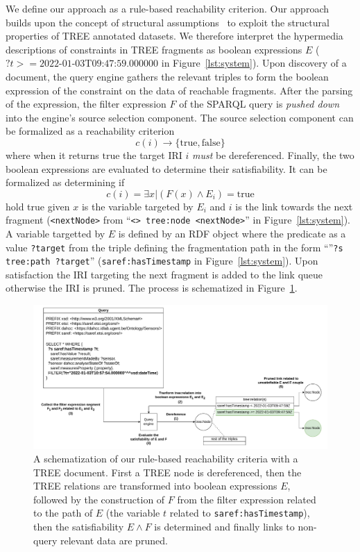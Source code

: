 We define our approach as a rule-based reachability criterion.
Our approach builds upon the concept of structural assumptions~\cite{taelman2023} to exploit the structural properties of TREE annotated datasets.
We therefore interpret the hypermedia descriptions of constraints in TREE fragments as boolean expressions $E$ ($?t>= \text{2022-01-03T09:47:59.000000}$ in Figure~\ref{lst:system}).
Upon discovery of a document, the query engine gathers the relevant triples to form the boolean expression of the constraint on the data of reachable fragments.
After the parsing of the expression, the filter expression $F$ of the SPARQL query is \textit{pushed down} into the engine's source selection component.
The source selection component can be formalized as a reachability criterion~ 
\begin{equation}
c(i) \rightarrow \{\mathrm{true}, \mathrm{false}\}
\end{equation}
where when it returns $\mathrm{true}$ the target IRI $i$ \emph{must} be dereferenced.
Finally, the two boolean expressions are evaluated to determine their satisfiability.
It can be formalized as determining if 
\begin{equation}
    c(i) = \exists x | (F(x) \land E_i) = \mathrm{true}
\end{equation}
hold true given $x$ is the variable targeted by $E_i$ and $i$ is the link towards the next fragment (\texttt{<nextNode>} from ``\texttt{<> tree:node <nextNode>}'' in Figure~\ref{lst:system}).
A variable targetted by $E$ is defined by an RDF object where the predicate as a value \texttt{?target} from the triple
defining the fragmentation path in the form ``''\texttt{?s tree:path ?target}'' (\texttt{saref:hasTimestamp} in Figure~\ref{lst:system}).
Upon satisfaction the IRI targeting the next fragment is added to the link queue otherwise the IRI is pruned.
The process is schematized in Figure~\ref{fig:process}.

\begin{figure}[htbp]
    \centering
    \includegraphics[width=\linewidth]{image/running_example.drawio.pdf}
    \caption{A schematization of our rule-based reachability criteria with a TREE document.
      First a TREE node is dereferenced, then the TREE relations are transformed into boolean expressions $E$,
      followed by the construction of $F$ from the filter expression related to the path of $E$ (the variable $t$ related to \texttt{saref:hasTimestamp}),
       then the satisfiability $E \land F$ is determined and finally links to non-query relevant data are pruned.}
    \label{fig:process}
  \end{figure}

